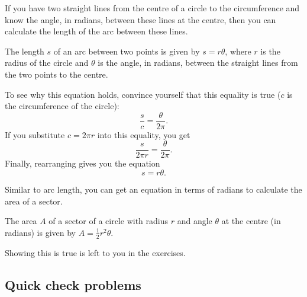 \documentclass[
  12pt,
  a4paper, oneside]{starmastarticle}
\begin{document}
If you have two straight lines from the centre of a circle to the
circumference and know the angle, in radians, between these lines at the
centre, then you can calculate the length of the arc between these
lines.

\begin{tcolorbox}[enhanced jigsaw, bottomrule=.15mm, rightrule=.15mm, breakable, leftrule=.75mm, opacityback=0, colbacktitle=quarto-callout-note-color!10!white, title=\textcolor{quarto-callout-note-color}{\faInfo}\hspace{0.5em}{Equation for arc length}, arc=.35mm, toprule=.15mm, bottomtitle=1mm, left=2mm, colframe=quarto-callout-note-color-frame, toptitle=1mm, titlerule=0mm, coltitle=black, opacitybacktitle=0.6, colback=white]
The length \(s\) of an arc between two points is given by
\(s = r \theta\), where \(r\) is the radius of the circle and \(\theta\)
is the angle, in radians, between the straight lines from the two points
to the centre.
\end{tcolorbox}

To see why this equation holds, convince yourself that this equality is
true (\(c\) is the circumference of the circle):
\[\frac{s}{c} = \frac{\theta}{2\pi}.\] If you substitute \(c = 2\pi r\)
into this equality, you get \[\frac{s}{2\pi r} = \frac{\theta}{2\pi}.\]
Finally, rearranging gives you the equation \[s = r \theta.\]

Similar to arc length, you can get an equation in terms of radians to
calculate the area of a sector.

\begin{tcolorbox}[enhanced jigsaw, bottomrule=.15mm, rightrule=.15mm, breakable, leftrule=.75mm, opacityback=0, colbacktitle=quarto-callout-note-color!10!white, title=\textcolor{quarto-callout-note-color}{\faInfo}\hspace{0.5em}{Equation for sector area}, arc=.35mm, toprule=.15mm, bottomtitle=1mm, left=2mm, colframe=quarto-callout-note-color-frame, toptitle=1mm, titlerule=0mm, coltitle=black, opacitybacktitle=0.6, colback=white]
The area \(A\) of a sector of a circle with radius \(r\) and angle
\(\theta\) at the centre (in radians) is given by
\(A = \frac{1}{2}r^2\theta\).
\end{tcolorbox}

Showing this is true is left to you in the exercises.

\hypertarget{quick-check-problems}{%
\subsection{Quick check problems}\label{quick-check-problems}}
\end{document}
